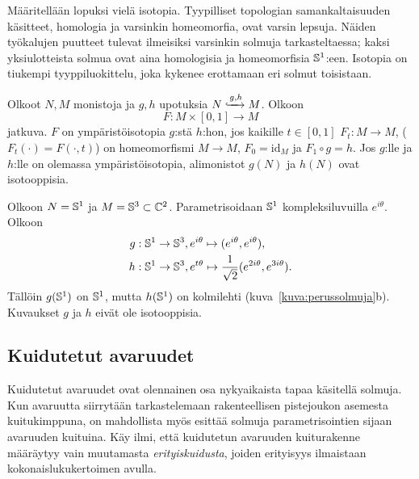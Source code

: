 Määritellään lopuksi vielä isotopia. Tyypilliset topologian samankaltaisuuden käsitteet, homologia ja varsinkin homeomorfia, ovat varsin lepsuja. Näiden työkalujen puutteet tulevat ilmeisiksi varsinkin solmuja tarkasteltaessa; kaksi yksiulotteista solmua ovat aina homologisia ja homeomorfisia $\S^1$:een. Isotopia on tiukempi tyyppiluokittelu, joka kykenee erottamaan eri solmut toisistaan.
\begin{maaritelma}
    Olkoot $N,M$ monistoja ja $g,h$ upotuksia $N\xhookrightarrow[]{g,h}M$. Olkoon
    \begin{equation*}
        F:M\times[0,1]\to M
    \end{equation*}
    jatkuva. $F$ on ympäristöisotopia $g$:stä $h$:hon, jos kaikille $t\in[0,1]$ $F_t:M\to M$, ($F_t(\cdot)=F(\cdot,t)$) on homeomorfismi $M\to M$, $F_0=\text{id}_M$ ja $F_1\circ g=h$. Jos $g$:lle ja $h$:lle on olemassa ympäristöisotopia, alimonistot $g(N)$ ja $h(N)$ ovat isotooppisia.
\end{maaritelma}
\begin{esimerkki}
    Olkoon $N=\S^1$ ja $M=\S^3\subset\C^2$. Parametrisoidaan $\S^1$ kompleksiluvuilla $e^{i\theta}$. Olkoon
    \begin{align*}
        g&:\S^1\to\S^3,e^{i\theta}\mapsto (e^{i\theta},e^{i\theta}), \\
        h&:\S^1\to\S^3,e^{t\theta}\mapsto \frac{1}{\sqrt{2}}(e^{2i\theta},e^{3i\theta}).
    \end{align*}
    Tällöin $g(\S^1)$ on $\S^1$, mutta $h(\S^1)$ on kolmilehti (kuva~\ref{kuva:perussolmuja}b). Kuvaukset $g$ ja $h$ eivät ole isotooppisia.
\end{esimerkki}


\subsection{Kuidutetut avaruudet}
Kuidutetut avaruudet ovat olennainen osa nykyaikaista tapaa käsitellä solmuja. Kun avaruutta siirrytään tarkastelemaan rakenteellisen pistejoukon asemesta kuitukimppuna, on mahdollista myös esittää solmuja parametrisointien sijaan avaruuden kuituina. Käy ilmi, että kuidutetun avaruuden kuiturakenne määräytyy vain muutamasta \emph{erityiskuidusta}, joiden erityisyys ilmaistaan kokonaislukukertoimen avulla.

